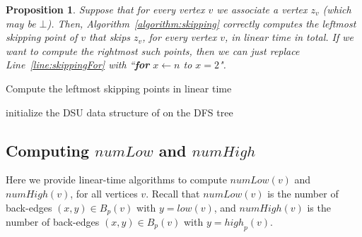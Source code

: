 \documentclass[11pt,a4paper]{article}
\newtheorem{proposition}[theorem]{Proposition}
\begin{document}
\begin{proposition}
\label{proposition:skipping}
Suppose that for every vertex $v$ we associate a vertex $z_v$ (which may be $\bot$). Then, Algorithm~\ref{algorithm:skipping} correctly computes the leftmost skipping point of $v$ that skips $z_v$, for every vertex $v$, in linear time in total. If we want to compute the rightmost such points, then we can just replace Line~\ref{line:skippingFor} with ``\textbf{for} $x\leftarrow n$ to $x=2$". 
\end{proposition}

\begin{algorithm}[h!]
\caption{\textsf{Compute the leftmost skipping points in linear time}}
\label{algorithm:skipping}
\LinesNumbered
\DontPrintSemicolon


initialize the DSU data structure of \cite{DBLP:journals/jcss/GabowT85} on the DFS tree\;


\end{algorithm}


\subsection{Computing $\mathit{numLow}$ and $\mathit{numHigh}$}
\label{section:numlow}
Here we provide linear-time algorithms to compute $\mathit{numLow}(v)$ and $\mathit{numHigh}(v)$, for all vertices $v$. Recall that $\mathit{numLow}(v)$ is the number of back-edges $(x,y)\in B_p(v)$ with $y=\mathit{low}(v)$, and $\mathit{numHigh}(v)$ is the number of back-edges $(x,y)\in B_p(v)$ with $y=\mathit{high}_p(v)$. 
\end{document}
